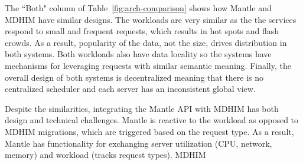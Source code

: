 The ``Both" column of Table~\ref{fig:arch-comparison} shows how Mantle and
MDHIM have similar designs. The workloads are very similar as the the services
respond to small and frequent requests, which results in hot spots and flash
crowds. As a result, popularity of the data, not the size, drives distribution
in both systems. Both workloads also have data locality so the systems have
mechanisms for leveraging requests with similar semantic meaning.  Finally, the
overall design of both systems is decentralized meaning that there is no
centralized scheduler and each server has an inconsistent global view.

Despite the similarities, integrating the Mantle API with MDHIM has both design
and technical challenges. Mantle is reactive to the workload as opposed to
MDHIM migrations, which are triggered based on the request type. As a result,
Mantle has functionality for exchanging server utilization (CPU, network,
memory) and workload (tracks request types). MDHIM 


